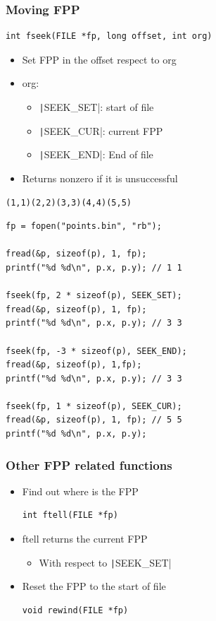 \documentclass{../c-lecture}
\begin{document}
\begin{frame}[fragile]
  \frametitle{Moving FPP}
  \begin{verbatim}
int fseek(FILE *fp, long offset, int org)
  \end{verbatim}
  \begin{itemize}
    \item Set FPP in the offset respect to org
    \item org:
    \begin{itemize}
      \item \texttt|SEEK_SET|: start of file
      \item \texttt|SEEK_CUR|: current FPP
      \item \texttt|SEEK_END|: End of file
    \end{itemize}
    \item Returns nonzero if it is unsuccessful
  \end{itemize}
\end{frame}

\begin{frame}[fragile]
  \begin{verbatim}
(1,1)(2,2)(3,3)(4,4)(5,5)
  \end{verbatim}
  \begin{verbatim}
fp = fopen("points.bin", "rb");

fread(&p, sizeof(p), 1, fp);
printf("%d %d\n", p.x, p.y); // 1 1

fseek(fp, 2 * sizeof(p), SEEK_SET);
fread(&p, sizeof(p), 1, fp);
printf("%d %d\n", p.x, p.y); // 3 3

fseek(fp, -3 * sizeof(p), SEEK_END);
fread(&p, sizeof(p), 1,fp);
printf("%d %d\n", p.x, p.y); // 3 3

fseek(fp, 1 * sizeof(p), SEEK_CUR);
fread(&p, sizeof(p), 1, fp); // 5 5
printf("%d %d\n", p.x, p.y);
  \end{verbatim}
\end{frame}

\begin{frame}[fragile]
  \frametitle{Other FPP related functions}
  \begin{itemize}
    \item Find out where is the FPP
    \begin{verbatim}
int ftell(FILE *fp)
    \end{verbatim}
    \item ftell returns the current FPP
    \begin{itemize}
      \item With respect to \texttt|SEEK_SET|
    \end{itemize}
    \item Reset the FPP to the start of file
    \begin{verbatim}
void rewind(FILE *fp)
    \end{verbatim}
  \end{itemize}
\end{frame}
\end{document}
